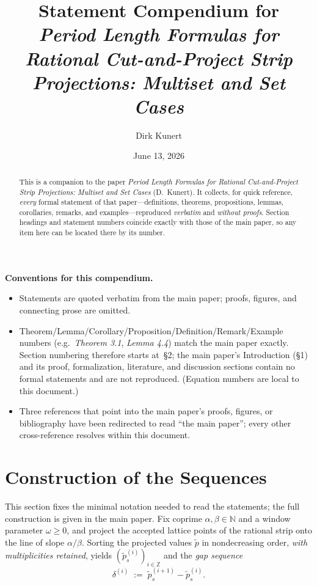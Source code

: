 \documentclass[11pt,reqno]{amsart}
\title[Statement Compendium: Rational Cut-and-Project Period Length
Formulas]{%
  Statement Compendium for\\
  \emph{Period Length Formulas for Rational Cut-and-Project Strip
  Projections: Multiset and Set Cases}}
\author{Dirk Kunert}
\date{June 13, 2026}
\theoremstyle{plain}
\theoremstyle{definition}
\theoremstyle{remark}
\begin{document}
\maketitle

\begin{abstract}
This is a companion to the paper \emph{Period Length Formulas for Rational
Cut-and-Project Strip Projections: Multiset and Set Cases} (D.\ Kunert).
It collects, for quick reference, \emph{every} formal statement of that
paper---definitions, theorems, propositions, lemmas, corollaries, remarks,
and examples---reproduced \emph{verbatim} and \emph{without proofs}.
Section headings and statement numbers coincide exactly with those of the
main paper, so any item here can be located there by its number.
\end{abstract}

\noindent\textbf{Conventions for this compendium.}
\begin{itemize}
  \item Statements are quoted verbatim from the main paper; proofs, figures,
        and connecting prose are omitted.
  \item Theorem/Lemma/Corollary/Proposition/Definition/Remark/Example
        numbers (e.g.\ \emph{Theorem 3.1}, \emph{Lemma 4.4}) match the main
        paper exactly. Section numbering therefore starts at~\S2; the main
        paper's Introduction (\S1) and its proof, formalization, literature,
        and discussion sections contain no formal statements and are not
        reproduced. (Equation numbers are local to this document.)
  \item Three references that point into the main paper's proofs, figures, or
        bibliography have been redirected to read ``the main paper''; every
        other cross-reference resolves within this document.
\end{itemize}

\medskip

\setcounter{section}{1}
\section{Construction of the Sequences}\label{sec:setup}

This section fixes the minimal notation needed to read the statements; the
full construction is given in the main paper. Fix coprime
\(\alpha, \beta \in \mathbb{N}\) and a window parameter \(\omega \ge 0\), and
project the accepted lattice points of the rational strip onto the line of
slope \(\alpha/\beta\). Sorting the projected values \(\tilde{p}\) in
nondecreasing order, \emph{with multiplicities retained}, yields
\((\tilde{p}^{(i)}_s)_{i \in \mathbb{Z}}\) and the \emph{gap sequence}
\begin{equation}\label{eq:delta}
    \delta^{(i)} \;:=\; \tilde{p}^{(i+1)}_s - \tilde{p}^{(i)}_s.
\end{equation}
\end{document}
